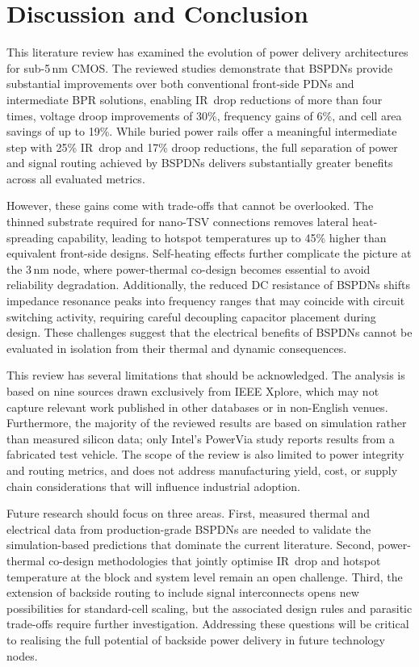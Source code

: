 \section{Discussion and Conclusion}

This literature review has examined the evolution of power delivery architectures for sub-5\,nm CMOS. The reviewed studies demonstrate that BSPDNs provide substantial improvements over both conventional front-side PDNs and intermediate BPR solutions, enabling IR~drop reductions of more than four times\cite{8932458}, voltage droop improvements of 30\%\cite{10185208}, frequency gains of 6\%\cite{10185208}, and cell area savings of up to 19\%\cite{10631463}. While buried power rails offer a meaningful intermediate step with 25\% IR~drop and 17\% droop reductions\cite{9817394}, the full separation of power and signal routing achieved by BSPDNs delivers substantially greater benefits across all evaluated metrics.

However, these gains come with trade-offs that cannot be overlooked. The thinned substrate required for nano-TSV connections removes lateral heat-spreading capability, leading to hotspot temperatures up to 45\% higher than equivalent front-side designs\cite{10925422}. Self-heating effects further complicate the picture at the 3\,nm node, where power-thermal co-design becomes essential to avoid reliability degradation\cite{10529350}. Additionally, the reduced DC resistance of BSPDNs shifts impedance resonance peaks into frequency ranges that may coincide with circuit switching activity\cite{8993617}, requiring careful decoupling capacitor placement during design. These challenges suggest that the electrical benefits of BSPDNs cannot be evaluated in isolation from their thermal and dynamic consequences.

This review has several limitations that should be acknowledged. The analysis is based on nine sources drawn exclusively from IEEE Xplore, which may not capture relevant work published in other databases or in non-English venues. Furthermore, the majority of the reviewed results are based on simulation rather than measured silicon data; only Intel's PowerVia study\cite{10185208} reports results from a fabricated test vehicle. The scope of the review is also limited to power integrity and routing metrics, and does not address manufacturing yield, cost, or supply chain considerations that will influence industrial adoption.

Future research should focus on three areas. First, measured thermal and electrical data from production-grade BSPDNs are needed to validate the simulation-based predictions that dominate the current literature. Second, power-thermal co-design methodologies that jointly optimise IR~drop and hotspot temperature at the block and system level remain an open challenge. Third, the extension of backside routing to include signal interconnects\cite{11192533} opens new possibilities for standard-cell scaling, but the associated design rules and parasitic trade-offs require further investigation. Addressing these questions will be critical to realising the full potential of backside power delivery in future technology nodes.
